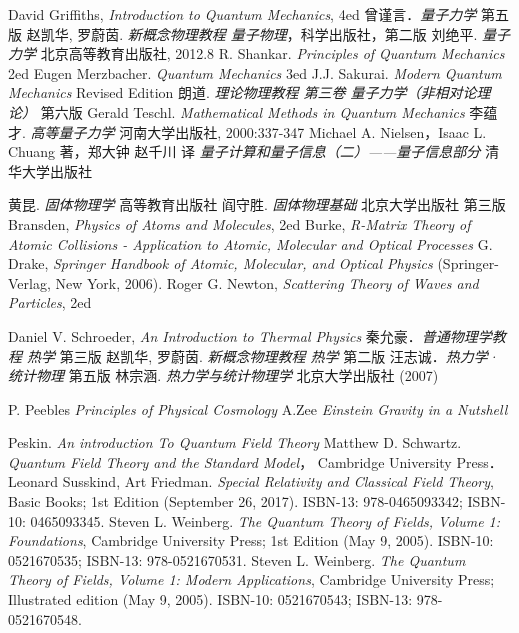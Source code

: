 \begin{thebibliography}{99}
David Griffiths, \textsl{Introduction to Quantum Mechanics}, 4ed
曾谨言．\textsl{量子力学} 第五版
赵凯华, 罗蔚茵. \textsl{新概念物理教程 量子物理}，科学出版社，第二版
刘绝平. \textsl{量子力学} 北京高等教育出版社, 2012.8
R. Shankar. \textsl{Principles of Quantum Mechanics} 2ed
Eugen Merzbacher. \textsl{Quantum  Mechanics} 3ed
J.J. Sakurai. \textsl{Modern Quantum Mechanics} Revised Edition
朗道. \textsl{理论物理教程 第三卷 量子力学（非相对论理论）} 第六版
Gerald Teschl. \textsl{Mathematical Methods in Quantum Mechanics}
李蕴才. \textsl{高等量子力学} 河南大学出版社, 2000:337-347
Michael A. Nielsen，Isaac L. Chuang 著，郑大钟 赵千川 译 \textsl{量子计算和量子信息（二）——量子信息部分} 清华大学出版社

黄昆. \textsl{固体物理学} 高等教育出版社
阎守胜. \textsl{固体物理基础} 北京大学出版社 第三版
Bransden, \textsl{Physics of Atoms and Molecules}, 2ed
Burke, \textsl{R-Matrix Theory of Atomic Collisions - Application to Atomic, Molecular and Optical Processes}
G. Drake, \textsl{Springer Handbook of Atomic, Molecular, and Optical Physics} (Springer-Verlag, New York, 2006).
Roger G. Newton, \textsl{Scattering Theory of Waves and Particles}, 2ed

Daniel V. Schroeder, \textsl{An Introduction to Thermal Physics}
秦允豪．\textsl{普通物理学教程 热学} 第三版
赵凯华, 罗蔚茵. \textsl{新概念物理教程 热学} 第二版
汪志诚．\textsl{热力学·统计物理}  第五版
林宗涵. \textsl{热力学与统计物理学} 北京大学出版社 (2007)

P. Peebles \textsl{Principles of Physical Cosmology}
A.Zee \textsl{Einstein Gravity in a Nutshell}

Peskin. \textsl{An introduction To Quantum Field Theory}
Matthew D. Schwartz. \textsl{Quantum Field Theory and the Standard Model}， Cambridge University Press．
Leonard Susskind, Art Friedman. \textsl{Special Relativity and Classical Field Theory}, Basic Books; 1st Edition (September 26, 2017). ISBN-13: 978-0465093342; ISBN-10: 0465093345. 
Steven L. Weinberg. \textsl{The Quantum Theory of Fields, Volume 1: Foundations}, Cambridge University Press; 1st Edition (May 9, 2005). ISBN-10: 0521670535; ISBN-13: 978-0521670531. 
Steven L. Weinberg. \textsl{The Quantum Theory of Fields, Volume 1: Modern Applications}, Cambridge University Press; Illustrated edition (May 9, 2005). ISBN-10: 0521670543; ISBN-13: 978-0521670548. 


\end{thebibliography}
